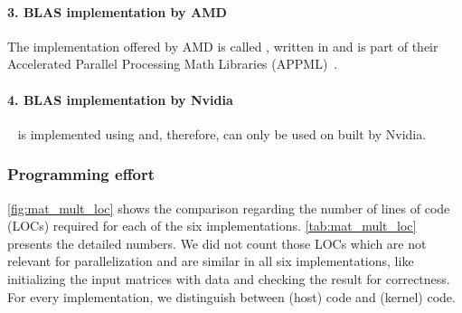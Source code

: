 \vspace{-.5em}
\paragraph{3. BLAS implementation by AMD}
The implementation offered by AMD is called \clBLAS, written in \OpenCL and is part of their Accelerated Parallel Processing Math Libraries (APPML)~\cite{APPML}.

\vspace{-.5em}
\paragraph{4. BLAS implementation by Nvidia}
\CUBLAS~\cite{cuBLAS} is implemented using \CUDA and, therefore, can only be used on \GPUs built by Nvidia.

\subsubsection*{Programming effort}
\autoref{fig:mat_mult_loc} shows the comparison regarding the number of lines of code (LOCs) required for each of the six implementations.
\autoref{tab:mat_mult_loc} presents the detailed numbers.
We did not count those LOCs which are not relevant for parallelization and are similar in all six implementations, like initializing the input matrices with data and checking the result for correctness.
For every implementation, we distinguish between \CPU (host) code and \GPU (kernel) code.


